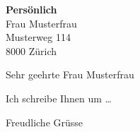\documentclass{Classes/custom_letter}
\date{\today}
\begin{document}
\begin{letter}{
		\textbf{Persönlich}\\
		Frau Musterfrau\\
		Musterweg 114\\
		8000 Zürich
	}

	\opening{Sehr geehrte Frau Musterfrau}

	Ich schreibe Ihnen um \dots

	\closing{Freudliche Grüsse}

\end{letter}
\end{document}
